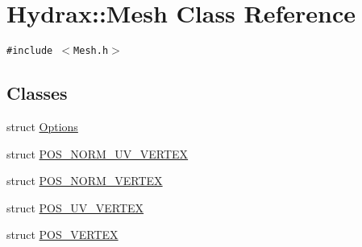 \hypertarget{class_hydrax_1_1_mesh}{
\section{Hydrax::Mesh Class Reference}
\label{class_hydrax_1_1_mesh}
}
{\tt \#include $<$Mesh.h$>$}

\subsection*{Classes}
\begin{CompactItemize}
\item 
struct \hyperlink{struct_hydrax_1_1_mesh_1_1_options}{Options}
\item 
struct \hyperlink{struct_hydrax_1_1_mesh_1_1_p_o_s___n_o_r_m___u_v___v_e_r_t_e_x}{POS\_\-NORM\_\-UV\_\-VERTEX}
\item 
struct \hyperlink{struct_hydrax_1_1_mesh_1_1_p_o_s___n_o_r_m___v_e_r_t_e_x}{POS\_\-NORM\_\-VERTEX}
\item 
struct \hyperlink{struct_hydrax_1_1_mesh_1_1_p_o_s___u_v___v_e_r_t_e_x}{POS\_\-UV\_\-VERTEX}
\item 
struct \hyperlink{struct_hydrax_1_1_mesh_1_1_p_o_s___v_e_r_t_e_x}{POS\_\-VERTEX}
\end{CompactItemize}
